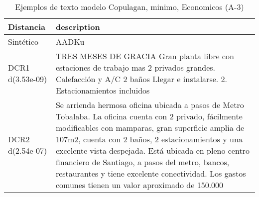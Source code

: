 \begin{table}[H]
\centering
\fontsize{10}{14}\selectfont
\caption{Ejemplos de texto modelo Copulagan, minimo, Economicos (A-3)}
\label{table-example-economicos-a-3-copulagan-min-text}
\begin{tabular}{|l|m{35em}|}
\hline
\rowcolor[gray]{0.8}
Distancia & description \\
\hline Sintético & AADKu \\
\hline DCR1 d(3.53e-09) & TRES MESES DE GRACIA  Gran planta libre con estaciones de trabajo mas 2 privados grandes. Calefacci\'on y A/C 2 ba\~nos Llegar e instalarse. 2. Estacionamientos incluidos \\
\hline DCR2 d(2.54e-07) & Se arrienda hermosa oficina ubicada a pasos de Metro Tobalaba.  La oficina cuenta con 2 privado, f\'acilmente modificables con mamparas, gran superficie amplia de 107m2, cuenta con 2 ba\~nos, 2 estacionamientos y una excelente vista despejada. Est\'a ubicada en pleno centro financiero de Santiago, a pasos del metro, bancos, restaurantes y tiene excelente conectividad. Los gastos comunes tienen un valor aproximado de 150.000 \\
\hline
\end{tabular}
\end{table}
